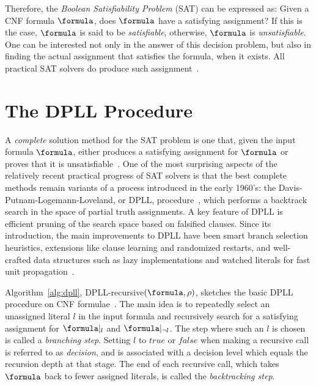 Therefore, the \emph{Boolean Satisfiability Problem} (SAT) can be expressed as:
Given a CNF formula $\formula$, does $\formula$ have a satisfying assignment? If
this is the case, $\formula$ is said to be \emph{satisfiable}, otherwise,
$\formula$ is \emph{unsatisfiable}.  One can be interested not only in the
answer of this decision problem, but also in finding the actual assignment that
satisfies the formula, when it exists. All practical SAT solvers do produce such
assignment~\cite{cormen}. 

\section{The DPLL Procedure}
\label{sec:dpll}

A \emph{complete} solution method for the SAT problem is one that, given the
input formula $\formula$, either produces a satisfying assignment for $\formula$
or proves that it is unsatisfiable~\cite{satchapter}. One of the most surprising
aspects of the relatively recent practical progress of SAT solvers is that the
best complete methods remain variants of a process introduced in the early
1960’s: the Davis-Putnam-Logemann-Loveland, or DPLL,
procedure~\cite{DavisLongemannLoveland:1962}, which performs a backtrack search
in the space of partial truth assignments. A key feature of DPLL is efficient
pruning of the search space based on falsified clauses. Since its introduction,
the main improvements to DPLL have been smart branch selection heuristics,
extensions like clause learning and randomized restarts, and well-crafted data
structures such as lazy implementations and watched literals for fast unit
propagation~\cite{satchapter}.

Algorithm~\ref{alg:dpll}, DPLL-recursive$(\formula, \rho)$, sketches the basic
DPLL procedure on CNF formulae~\cite{DavisLongemannLoveland:1962}. The main idea
is to repeatedly select an unassigned literal $l$ in the input formula and
recursively search for a satisfying assignment for $\formula|_l$ and
$\formula|_{\neg l}$. The step where such an $l$ is chosen is called a
\emph{branching step}. Setting $l$ to $true$ or $false$ when making a recursive call
is referred to as \emph{decision}, and is associated with a decision level which
equals the recursion depth at that stage. The end of each recursive call, which
takes $\formula$ back to fewer assigned literals, is called the
\emph{backtracking step}.

